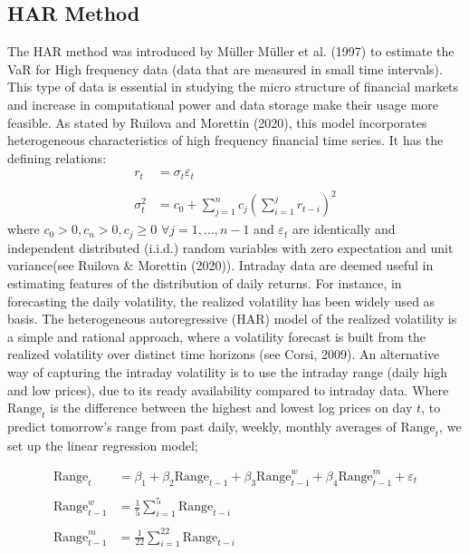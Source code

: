 \documentclass[a4paper,11pt,oneside]{book}
\begin{document}
\subsection{HAR Method}
The HAR method was introduced by Müller Müller et al. (1997) to estimate the VaR for High frequency data (data that are measured in small time intervals). This type of data is essential in studying the micro structure of financial markets and  increase in computational power and data storage make their usage more feasible. As stated by Ruilova and Morettin (2020), this model incorporates
heterogeneous characteristics of high frequency financial time series. It has the defining relations: 
\begin{equation}
\begin{aligned}
r_t &= \sigma_t\varepsilon_t
\\
\\
\sigma_t^2 &= c_0 + \sum_{j=1}^{n}c_j\left(\sum_{i=1}^{j}r_{t-i}\right)^2
\label{3}
\end{aligned}
\end{equation}
where $c_0>0, c_n > 0, c_j \ge 0$ $\forall j = 1,...,n-1$ and $\varepsilon_t$ are identically and independent distributed (i.i.d.) random variables with zero expectation and unit variance(see Ruilova \& Morettin (2020)).
\newline
\newline
Intraday data are deemed useful in estimating features of the distribution of daily returns. For
instance, in forecasting the daily volatility, the realized volatility has been widely used as basis. The heterogeneous autoregressive (HAR) model of the realized
volatility is a simple and rational approach, where a
volatility forecast is built from the realized volatility over distinct time horizons (see Corsi, 2009). An alternative way of
capturing the intraday volatility is to use the intraday range (daily high and low prices), due to its ready availability compared to  intraday data. Where $\text{Range}_{t}$
is the difference between the highest and
lowest log prices on day $t$, to predict tomorrow's range from past daily, weekly, monthly averages of $\text{Range}_{t}$, we set up the linear regression model;

\begin{equation}
\begin{aligned}
\text{Range}_{t}&=\beta_1+\beta_{2}\text{Range}_{t-1}+\beta_{3}\text{Range}^{w}_{t-1}+\beta_{4}\text{Range}^{m}_{t-1}+\varepsilon_t
\\
\\
\text{Range}^{w}_{t-1}&=\frac{1}{5}\sum_{i=1}^{5}\text{Range}_{t-i}
\\
\\
\text{Range}^{m}_{t-1}&=\frac{1}{22}\sum_{i=1}^{22}\text{Range}_{t-i}
\label{4}
\end{aligned}
\end{equation}
\end{document}
